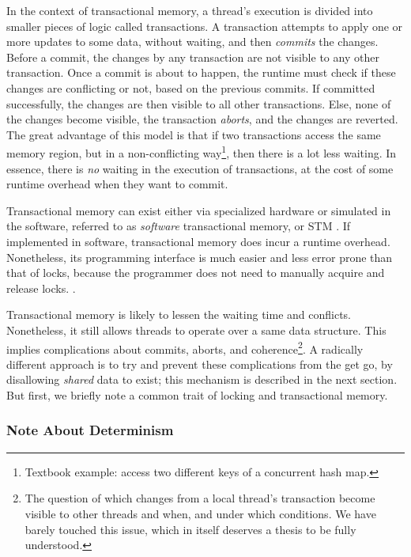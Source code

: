 In the context of transactional memory, a thread's execution is divided into smaller pieces of logic
called transactions. A transaction attempts to apply one or more updates to some data, without
waiting, and then \textit{commits} the changes. Before a commit, the changes by any transaction are
not visible to any other transaction. Once a commit is about to happen, the runtime must check if
these changes are conflicting or not, based on the previous commits. If committed successfully, the
changes are then visible to all other transactions. Else, none of the changes become visible, the
transaction \textit{aborts}, and the changes are reverted. The great advantage of this model is that
if two transactions access the same memory region, but in a non-conflicting way\footnote{Textbook
example: access two different keys of a concurrent hash map.}, then there is a lot less waiting. In
essence, there is \textit{no} waiting in the execution of transactions, at the cost of some runtime
overhead when they want to commit.

Transactional memory can exist either via specialized hardware or simulated in the software,
referred to as \textit{software} transactional memory, or STM
\cite{hammondTransactionalMemoryCoherence2004}. If implemented in software, transactional memory
does incur a runtime overhead. Nonetheless, its programming interface is much easier and less error
prone than that of locks, because the programmer does not need to manually acquire and release
locks. \cite{herlihyTransactionalMemoryArchitectural1993}.

Transactional memory is likely to lessen the waiting time and conflicts. Nonetheless, it still
allows threads to operate over a same data structure. This implies complications about commits,
aborts, and coherence\footnote{The question of which changes from a local thread's transaction
become visible to other threads and when, and under which conditions. We have barely touched this
issue, which in itself deserves a thesis to be fully understood.}. A radically different approach is
to try and prevent these complications from the get go, by disallowing \textit{shared} data to
exist; this mechanism is described in the next section. But first, we briefly note a common trait of
locking and transactional memory.

\subsubsection*{Note About Determinism}

